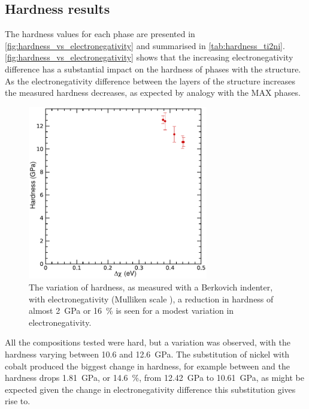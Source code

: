 \subsection{Hardness results}



The hardness values for each phase are presented in \autoref{fig:hardness_vs_electronegativity} and summarised in \autoref{tab:hardness_ti2ni}. \autoref{fig:hardness_vs_electronegativity} shows that the increasing electronegativity difference has a substantial impact on the hardness of phases with the  structure. As the electronegativity difference between the layers of the  structure increases the measured hardness decreases, as expected by analogy with the MAX phases. 


\begin{figure}[!htb]
\centering
\captionsetup{width=0.7\textwidth}
\includegraphics[width=0.7\textwidth]{Ti2Ni_H_vs_dX}
\caption[The variation of hardness with electronegativity difference in .]{The variation of hardness, as measured with a Berkovich indenter, with electronegativity (Mulliken scale \cite{Mulliken1934}), a reduction in hardness of almost \SI{2}{\giga\pascal} or \SI{16}{\percent} is seen for a modest variation in electronegativity.\label{fig:hardness_vs_electronegativity}}
\end{figure}



All the compositions tested were hard, but a variation was observed, with the hardness varying between \num{10.6} and \SI{12.6}{\giga\pascal}. The substitution of nickel with cobalt produced the biggest change in hardness, for example between  and  the hardness drops \SI{1.81}{\giga\pascal}, or \SI{14.6}{\percent}, from \SI{12.42}{\giga\pascal} to \SI{10.61}{\giga\pascal}, as might be expected given the change in electronegativity difference this substitution gives rise to.


